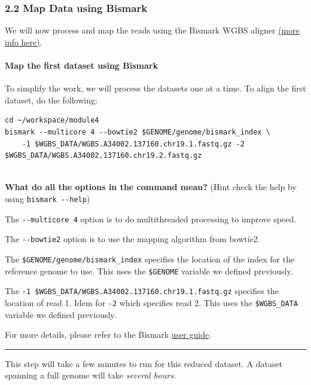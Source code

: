 \documentclass[
]{book}
\begin{document}
\subsubsection{2.2 Map Data using Bismark}\label{map-data-using-bismark}

We will now process and map the reads using the Bismark WGBS aligner \href{https://www.bioinformatics.babraham.ac.uk/projects/bismark/}{(more info here)}.

\paragraph{Map the first dataset using Bismark}\label{map-the-first-dataset-using-bismark}

To simplify the work, we will process the datasets one at a time. To align the first dataset, do the following:

\begin{verbatim}
cd ~/workspace/module4
bismark --multicore 4 --bowtie2 $GENOME/genome/bismark_index \
    -1 $WGBS_DATA/WGBS.A34002.137160.chr19.1.fastq.gz -2 $WGBS_DATA/WGBS.A34002.137160.chr19.2.fastq.gz
    
\end{verbatim}

\textbf{What do all the options in the command mean?} (Hint check the help by using \texttt{bismark\ -\/-help})

The \texttt{-\/-multicore\ 4} option is to do multithreaded processing to improve speed.

The \texttt{-\/-bowtie2} option is to use the mapping algorithm from bowtie2.

The \texttt{\$GENOME/genome/bismark\_index} specifies the location of the index for the reference genome to use. This uses the \texttt{\$GENOME} variable we defined previously.

The \texttt{-1\ \$WGBS\_DATA/WGBS.A34002.137160.chr19.1.fastq.gz} specifies the location of read 1. Idem for \texttt{-2} which specifies read 2. This uses the \texttt{\$WGBS\_DATA} variable we defined previously.

For more details, please refer to the Bismark \href{http://www.bioinformatics.babraham.ac.uk/projects/bismark/Bismark_User_Guide.pdf}{user guide}.

\begin{center}\rule{0.5\linewidth}{0.5pt}\end{center}

This step will take a few minutes to run for this reduced dataset. A dataset spanning a full genome will take \emph{several hours}.
\end{document}
